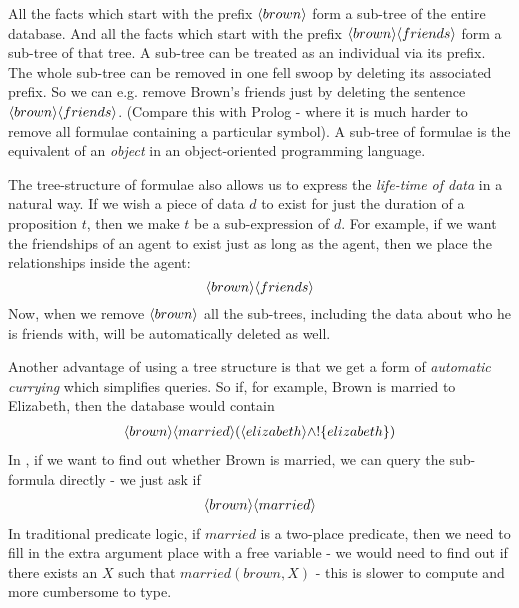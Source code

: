 \NI All the facts which start with the prefix $\MAY{brown}$ form a
sub-tree of the entire database.  And all the facts which start with
the prefix $\MAY{brown} \MAY{friends}$ form a sub-tree of that tree.
A sub-tree can be treated as an individual via its prefix.  The whole
sub-tree can be removed in one fell swoop by deleting its associated
prefix.  So we can e.g. remove Brown's friends just by deleting the
sentence $\MAY{brown} \MAY{friends}$.  (Compare this with Prolog -
where it is much harder to remove all formulae containing a particular
symbol).  A sub-tree of formulae is the \ELABR{} equivalent of an
\emph{object} in an object-oriented programming language.

The tree-structure of formulae also allows us to express the \emph{life-time of data} in a natural way. 
If we wish a piece of data $d$ to exist for just the duration of a proposition $t$, then we make $t$ be a sub-expression of $d$. 
For example, if we want the friendships of an agent to exist just as long as the agent, then we place the relationships inside the agent: 
\[
\langle brown \rangle \langle friends \rangle \]
Now, when we remove $\MAY{brown}$ all the sub-trees, including the data about who he is friends with, will be automatically deleted as well.

Another advantage of using a tree structure is that we get a form of \emph{automatic currying} which simplifies queries.
So if, for example, Brown is married to Elizabeth, then the database would contain 
\begin{eqnarray*}
\langle brown \rangle \langle married \rangle (\langle elizabeth \rangle \land ! \{elizabeth\})
\end{eqnarray*}
In \ELFULL{}, if we want to find out whether Brown is married, we can query the sub-formula directly -  we just ask if 
\begin{eqnarray*}
\langle brown \rangle \langle married \rangle \end{eqnarray*}
In traditional predicate logic, if $married$ is a two-place predicate, then we need to fill in the extra argument place with a free variable - we would need to find out if there exists an $X$ such that $married(brown, X)$ - this is slower to compute and more cumbersome to type. 

